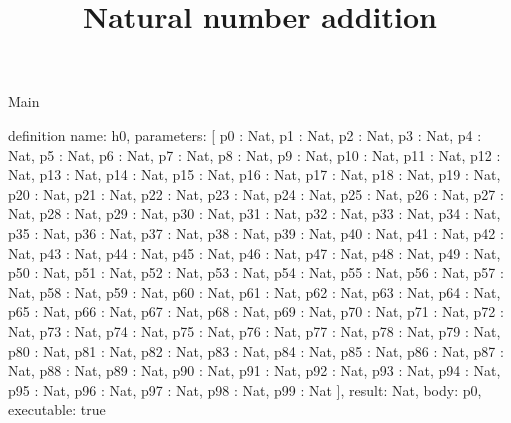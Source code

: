 \begin{lexlean}{Main}
\title{Natural number addition}
\begin{semanticmodule}
definition{
  name: h0,
  parameters: [
    p0 : Nat,
    p1 : Nat,
    p2 : Nat,
    p3 : Nat,
    p4 : Nat,
    p5 : Nat,
    p6 : Nat,
    p7 : Nat,
    p8 : Nat,
    p9 : Nat,
    p10 : Nat,
    p11 : Nat,
    p12 : Nat,
    p13 : Nat,
    p14 : Nat,
    p15 : Nat,
    p16 : Nat,
    p17 : Nat,
    p18 : Nat,
    p19 : Nat,
    p20 : Nat,
    p21 : Nat,
    p22 : Nat,
    p23 : Nat,
    p24 : Nat,
    p25 : Nat,
    p26 : Nat,
    p27 : Nat,
    p28 : Nat,
    p29 : Nat,
    p30 : Nat,
    p31 : Nat,
    p32 : Nat,
    p33 : Nat,
    p34 : Nat,
    p35 : Nat,
    p36 : Nat,
    p37 : Nat,
    p38 : Nat,
    p39 : Nat,
    p40 : Nat,
    p41 : Nat,
    p42 : Nat,
    p43 : Nat,
    p44 : Nat,
    p45 : Nat,
    p46 : Nat,
    p47 : Nat,
    p48 : Nat,
    p49 : Nat,
    p50 : Nat,
    p51 : Nat,
    p52 : Nat,
    p53 : Nat,
    p54 : Nat,
    p55 : Nat,
    p56 : Nat,
    p57 : Nat,
    p58 : Nat,
    p59 : Nat,
    p60 : Nat,
    p61 : Nat,
    p62 : Nat,
    p63 : Nat,
    p64 : Nat,
    p65 : Nat,
    p66 : Nat,
    p67 : Nat,
    p68 : Nat,
    p69 : Nat,
    p70 : Nat,
    p71 : Nat,
    p72 : Nat,
    p73 : Nat,
    p74 : Nat,
    p75 : Nat,
    p76 : Nat,
    p77 : Nat,
    p78 : Nat,
    p79 : Nat,
    p80 : Nat,
    p81 : Nat,
    p82 : Nat,
    p83 : Nat,
    p84 : Nat,
    p85 : Nat,
    p86 : Nat,
    p87 : Nat,
    p88 : Nat,
    p89 : Nat,
    p90 : Nat,
    p91 : Nat,
    p92 : Nat,
    p93 : Nat,
    p94 : Nat,
    p95 : Nat,
    p96 : Nat,
    p97 : Nat,
    p98 : Nat,
    p99 : Nat
  ],
  result: Nat,
  body: p0,
  executable: true
}


\end{semanticmodule}
\end{lexlean}
